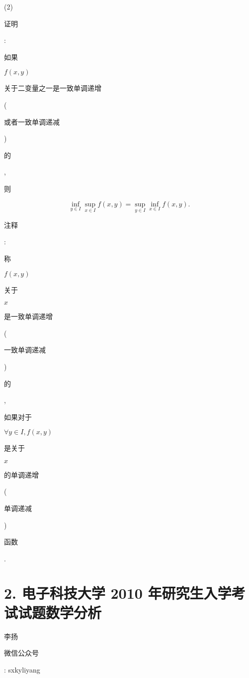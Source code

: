 \documentclass[10pt]{article}
\begin{document}
(2) \begin{CJK}{UTF8}{mj}证明\end{CJK}: \begin{CJK}{UTF8}{mj}如果\end{CJK} $f(x, y)$ \begin{CJK}{UTF8}{mj}关于二变量之一是一致单调递增\end{CJK} (\begin{CJK}{UTF8}{mj}或者一致单调递减\end{CJK})\begin{CJK}{UTF8}{mj}的\end{CJK}, \begin{CJK}{UTF8}{mj}则\end{CJK}
$$
\inf _{y \in I} \sup _{x \in I} f(x, y)=\sup _{y \in I} \inf _{x \in I} f(x, y) .
$$
\begin{CJK}{UTF8}{mj}注释\end{CJK}: \begin{CJK}{UTF8}{mj}称\end{CJK} $f(x, y)$ \begin{CJK}{UTF8}{mj}关于\end{CJK} $x$ \begin{CJK}{UTF8}{mj}是一致单调递增\end{CJK} (\begin{CJK}{UTF8}{mj}一致单调递减\end{CJK})\begin{CJK}{UTF8}{mj}的\end{CJK}, \begin{CJK}{UTF8}{mj}如果对于\end{CJK} $\forall y \in I, f(x, y)$ \begin{CJK}{UTF8}{mj}是关于\end{CJK} $x$ \begin{CJK}{UTF8}{mj}的单调递增\end{CJK} (\begin{CJK}{UTF8}{mj}单调递减\end{CJK}) \begin{CJK}{UTF8}{mj}函数\end{CJK}.

\section{2. 电子科技大学 2010 年研究生入学考试试题数学分析}
\begin{CJK}{UTF8}{mj}李扬\end{CJK}

\begin{CJK}{UTF8}{mj}微信公众号\end{CJK}: sxkyliyang
\end{document}
